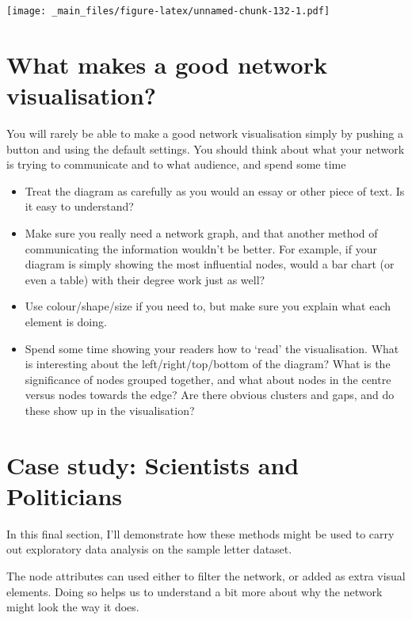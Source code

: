 \documentclass[
]{book}
\begin{document}
\texttt{[image: \_main\_files/figure-latex/unnamed-chunk-132-1.pdf]}

\hypertarget{what-makes-a-good-network-visualisation}{%
\section{What makes a good network visualisation?}\label{what-makes-a-good-network-visualisation}}

You will rarely be able to make a good network visualisation simply by pushing a button and using the default settings. You should think about what your network is trying to communicate and to what audience, and spend some time

\begin{itemize}
\item
  Treat the diagram as carefully as you would an essay or other piece of text. Is it easy to understand?
\item
  Make sure you really need a network graph, and that another method of communicating the information wouldn't be better. For example, if your diagram is simply showing the most influential nodes, would a bar chart (or even a table) with their degree work just as well?
\item
  Use colour/shape/size if you need to, but make sure you explain what each element is doing.
\item
  Spend some time showing your readers how to `read' the visualisation. What is interesting about the left/right/top/bottom of the diagram? What is the significance of nodes grouped together, and what about nodes in the centre versus nodes towards the edge? Are there obvious clusters and gaps, and do these show up in the visualisation?
\end{itemize}

\hypertarget{case-study-scientists-and-politicians}{%
\section{Case study: Scientists and Politicians}\label{case-study-scientists-and-politicians}}

In this final section, I'll demonstrate how these methods might be used to carry out exploratory data analysis on the sample letter dataset.

The node attributes can used either to filter the network, or added as extra visual elements. Doing so helps us to understand a bit more about why the network might look the way it does.
\end{document}

